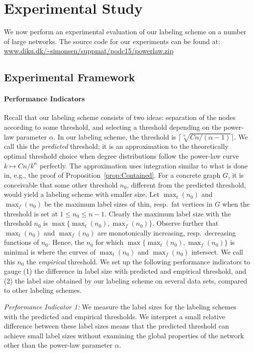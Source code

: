 \section{Experimental Study}

We now  perform an experimental evaluation of our labeling scheme on a number of large networks.
The source code for our experiments can be found at:\\ \url{www.diku.dk/\~simonsen/suppmat/podc15/powerlaw.zip}

\subsection{Experimental Framework}\label{Sec:Experimental}
\paragraph{Performance Indicators}
Recall that our labeling scheme consists of two ideas: separation of the nodes according to some threshold, and selecting a threshold depending on the power-law parameter $\alpha$.
In our labeling scheme, the threshold  is $\lceil \sqrt[\alpha]{C n/(\alpha-1)} \rceil$. We call this the \emph{predicted} threshold; it is an approximation to the theoretically optimal threshold choice when degree distributions follow the power-law curve $k\mapsto Cn/k^\alpha$ perfectly. The approximation uses integration similar to what is done in, e.g., the proof of Proposition~\ref{prop:Contained}.
For a concrete
graph $G$, it is conceivable that some other threshold $n_0$, different from the predicted threshold, would yield a labeling scheme with smaller size. 
Let $\max_t(n_0)$ and $\max_f(n_0)$ be the maximum label sizes of thin, resp.\ fat vertices in $G$ when the threshold is set at $1 \leq n_0 \leq n-1$. Clearly
the maximum label size with the threshold $n_0$ is $\max\{\max_t(n_0),\max_f(n_0)\}$. Observe further
that $\max_t(n_0)$ and $\max_f(n_0)$ are monotonically increasing, resp.\ decreasing functions of $n_0$. Hence,
the $n_0$ for which $\max\{\max_t(n_0),\max_f(n_0)\}$ is minimal is where the curves of $\max_t(n_0)$ and $\max_f(n_0)$ intersect. We call this $n_0$ the \emph{empirical} threshold.
We set up the following performance indicators to gauge (1) the difference in label size with predicted and empirical threshold, and (2) the label size obtained by our labeling scheme on several data sets, compared to other labeling schemes.

\emph{Performance Indicator 1:} We measure the label sizes for the labeling schemes with the predicted and empirical thresholds. We interpret a small relative difference between these label sizes means that the predicted threshold can achieve small label sizes without examining the global properties of the network other than the power-law parameter $\alpha$. 
 
